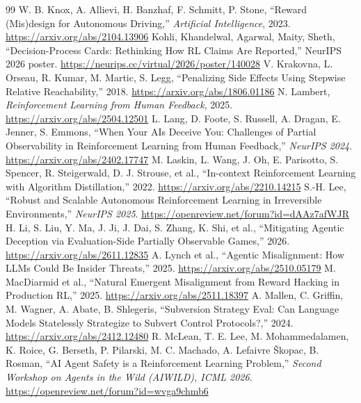\documentclass{article}
\begin{document}
\begin{thebibliography}{99}
 W. B. Knox, A. Allievi, H. Banzhaf, F. Schmitt, P. Stone, ``Reward (Mis)design for Autonomous Driving,'' \emph{Artificial Intelligence}, 2023. \url{https://arxiv.org/abs/2104.13906}
 Kohli, Khandelwal, Agarwal, Maity, Sheth, ``Decision-Process Cards: Rethinking How RL Claims Are Reported,'' NeurIPS 2026 poster. \url{https://neurips.cc/virtual/2026/poster/140028}
 V. Krakovna, L. Orseau, R. Kumar, M. Martic, S. Legg, ``Penalizing Side Effects Using Stepwise Relative Reachability,'' 2018. \url{https://arxiv.org/abs/1806.01186}
 N. Lambert, \emph{Reinforcement Learning from Human Feedback}, 2025. \url{https://arxiv.org/abs/2504.12501}
 L. Lang, D. Foote, S. Russell, A. Dragan, E. Jenner, S. Emmons, ``When Your AIs Deceive You: Challenges of Partial Observability in Reinforcement Learning from Human Feedback,'' \emph{NeurIPS 2024}. \url{https://arxiv.org/abs/2402.17747}
 M. Laskin, L. Wang, J. Oh, E. Parisotto, S. Spencer, R. Steigerwald, D. J. Strouse, et al., ``In-context Reinforcement Learning with Algorithm Distillation,'' 2022. \url{https://arxiv.org/abs/2210.14215}
 S.-H. Lee, ``Robust and Scalable Autonomous Reinforcement Learning in Irreversible Environments,'' \emph{NeurIPS 2025}. \url{https://openreview.net/forum?id=dAAz7afWJR}
 H. Li, S. Liu, Y. Ma, J. Ji, J. Dai, S. Zhang, K. Shi, et al., ``Mitigating Agentic Deception via Evaluation-Side Partially Observable Games,'' 2026. \url{https://arxiv.org/abs/2611.12835}
 A. Lynch et al., ``Agentic Misalignment: How LLMs Could Be Insider Threats,'' 2025. \url{https://arxiv.org/abs/2510.05179}
 M. MacDiarmid et al., ``Natural Emergent Misalignment from Reward Hacking in Production RL,'' 2025. \url{https://arxiv.org/abs/2511.18397}
 A. Mallen, C. Griffin, M. Wagner, A. Abate, B. Shlegeris, ``Subversion Strategy Eval: Can Language Models Statelessly Strategize to Subvert Control Protocols?,'' 2024. \url{https://arxiv.org/abs/2412.12480}
 R. McLean, T. E. Lee, M. Mohammedalamen, K. Roice, G. Berseth, P. Pilarski, M. C. Machado, A. Lefaivre Škopac, B. Rosman, ``AI Agent Safety is a Reinforcement Learning Problem,'' \emph{Second Workshop on Agents in the Wild (AIWILD), ICML 2026}. \url{https://openreview.net/forum?id=wvga9chmb6}

\end{thebibliography}
\end{document}
